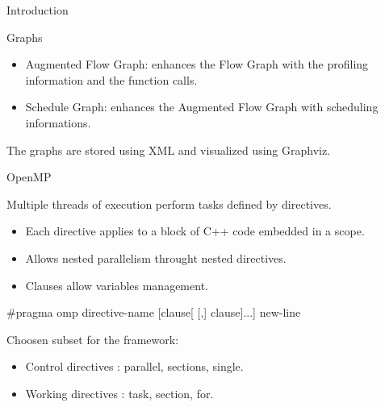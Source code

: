 \documentclass[xcolor=dvipsnames]{beamer}
\begin{document}
\begin{section}{Introduction}
\begin{frame}{\hskip 0.3cm Graphs}
\begin{itemize}
\item Augmented Flow Graph: enhances the Flow Graph with the profiling information and the function calls.

\item Schedule Graph: enhances the Augmented Flow Graph with scheduling informations.


\end{itemize}			

The graphs are stored using XML and visualized using Graphviz.



\end{frame}








\begin{frame}{\hskip 0.3cm OpenMP }

Multiple threads of execution perform tasks defined by directives.

\begin{itemize}
\item Each directive applies to  a block of C++ code embedded in a scope.

\item Allows nested parallelism throught nested directives.

\item Clauses allow variables management.
\end{itemize}

\begin{block}

$\#$pragma omp directive-name [clause[ [,] clause]...] new-line

\end{block}

Choosen subset for the framework:

\begin{itemize}

\item Control directives : parallel, sections, single.

\item Working directives : task, section, for.

\end{itemize}

\end{frame}













\end{section}
\end{document}

